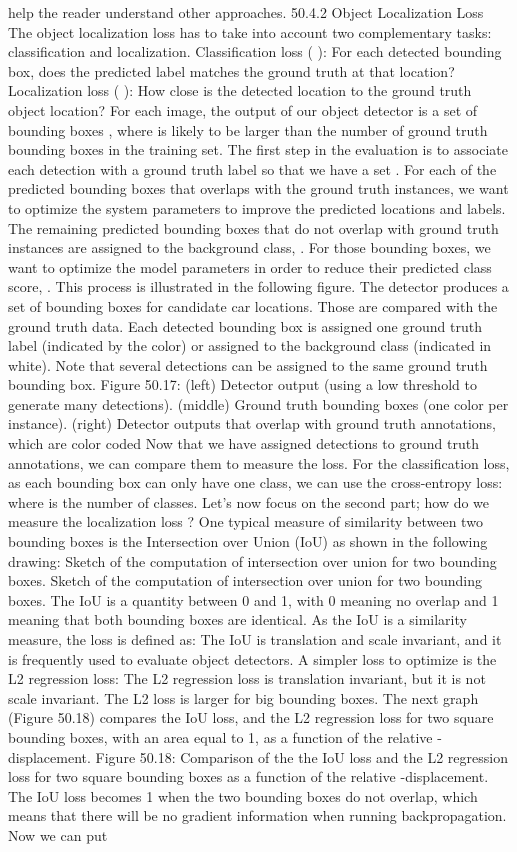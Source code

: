 help the reader understand other approaches. 50.4.2 Object Localization Loss The object localization loss has to take into account two complementary tasks: classification and localization. Classification loss ( ): For each detected bounding box, does the predicted label matches the ground truth at that location? Localization loss ( ): How close is the detected location to the ground truth object location? For each image, the output of our object detector is a set of bounding boxes , where is likely to be larger than the number of ground truth bounding boxes in the training set. The first step in the evaluation is to associate each detection with a ground truth label so that we have a set . For each of the predicted bounding boxes that overlaps with the ground truth instances, we want to optimize the system parameters to improve the predicted locations and labels. The remaining predicted bounding boxes that do not overlap with ground truth instances are assigned to the background class, . For those bounding boxes, we want to optimize the model parameters in order to reduce their predicted class score, . This process is illustrated in the following figure. The detector produces a set of bounding boxes for candidate car locations. Those are compared with the ground truth data. Each detected bounding box is assigned one ground truth label (indicated by the color) or assigned to the background class (indicated in white). Note that several detections can be assigned to the same ground truth bounding box. Figure 50.17: (left) Detector output (using a low threshold to generate many detections). (middle) Ground truth bounding boxes (one color per instance). (right) Detector outputs that overlap with ground truth annotations, which are color coded Now that we have assigned detections to ground truth annotations, we can compare them to measure the loss. For the classification loss, as each bounding box can only have one class, we can use the cross-entropy loss: where is the number of classes. Let’s now focus on the second part; how do we measure the localization loss ? One typical measure of similarity between two bounding boxes is the Intersection over Union (IoU) as shown in the following drawing: Sketch of the computation of intersection over union for two bounding boxes. Sketch of the computation of intersection over union for two bounding boxes. The IoU is a quantity between 0 and 1, with 0 meaning no overlap and 1 meaning that both bounding boxes are identical. As the IoU is a similarity measure, the loss is defined as: The IoU is translation and scale invariant, and it is frequently used to evaluate object detectors. A simpler loss to optimize is the L2 regression loss: The L2 regression loss is translation invariant, but it is not scale invariant. The L2 loss is larger for big bounding boxes. The next graph (Figure 50.18) compares the IoU loss, and the L2 regression loss for two square bounding boxes, with an area equal to 1, as a function of the relative -displacement. Figure 50.18: Comparison of the the IoU loss and the L2 regression loss for two square bounding boxes as a function of the relative -displacement. The IoU loss becomes 1 when the two bounding boxes do not overlap, which means that there will be no gradient information when running backpropagation. Now we can put 